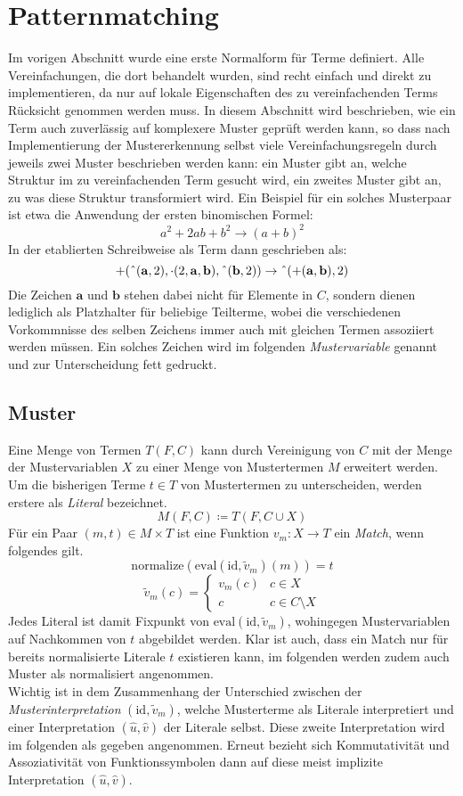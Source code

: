 \documentclass{scrartcl}
\begin{document}
\section{Patternmatching}
Im vorigen Abschnitt wurde eine erste Normalform für Terme definiert. Alle Vereinfachungen, die dort behandelt wurden, sind recht einfach und direkt zu implementieren, da nur auf lokale Eigenschaften des zu vereinfachenden Terms Rücksicht genommen werden muss. In diesem Abschnitt wird beschrieben, wie ein Term auch zuverlässig auf komplexere Muster geprüft werden kann, so dass nach Implementierung der Mustererkennung selbst viele Vereinfachungsregeln durch jeweils zwei Muster beschrieben werden kann: ein Muster gibt an, welche Struktur im zu vereinfachenden Term gesucht wird, ein zweites Muster gibt an, zu was diese Struktur transformiert wird. Ein Beispiel für ein solches Musterpaar ist etwa die Anwendung der ersten binomischen Formel:
$$a^2 + 2 a b + b^2 \rightarrow (a + b)^2$$
In der etablierten Schreibweise als Term dann geschrieben als:
$$+(\string^(\mathbf a, 2), \cdot(2, \mathbf a, \mathbf b), \string^(\mathbf b, 2)) \rightarrow \string^(+(\mathbf a, \mathbf b), 2)$$
Die Zeichen $\mathbf a$ und $\mathbf b$ stehen dabei nicht für Elemente in $C$, sondern dienen lediglich als Platzhalter für beliebige Teilterme, wobei die verschiedenen Vorkommnisse des selben Zeichens immer auch mit gleichen Termen assoziiert werden müssen. Ein solches Zeichen wird im folgenden \emph{Mustervariable} genannt und zur Unterscheidung fett gedruckt.

\subsection{Muster}
Eine Menge von Termen $T(F, C)$ kann durch Vereinigung von $C$ mit der Menge der Mustervariablen $X$ zu einer Menge von Mustertermen $M$ erweitert werden. 
Um die bisherigen Terme $t \in T$ von Mustertermen zu unterscheiden, werden erstere als \emph{Literal} bezeichnet.
$$M(F, C) \coloneqq T(F, C \cup X)$$
Für ein Paar $(m, t) \in M \times T$ ist eine Funktion $v_m \colon X \rightarrow T$ ein \emph{Match}, wenn folgendes gilt.
$$\mathrm{normalize}(\mathrm{eval}(\mathrm{id}, \tilde v_m)(m))= t$$
$$\tilde v_m(c) = \begin{cases}
	v_m(c) & c \in X\\
	c         & c \in C \setminus X
\end{cases}$$
Jedes Literal ist damit Fixpunkt von $\mathrm{eval}(\mathrm{id}, \tilde v_m)$, wohingegen Mustervariablen auf Nachkommen von $t$ abgebildet werden. 
Klar ist auch, dass ein Match nur für bereits normalisierte Literale $t$ existieren kann, im folgenden werden zudem auch Muster als normalisiert angenommen.\\
Wichtig ist in dem Zusammenhang der Unterschied zwischen der \emph{Musterinterpretation} $(\mathrm{id}, \tilde v_m)$, welche Musterterme als Literale interpretiert und einer Interpretation $(\hat{u}, \hat{v})$ der Literale selbst. Diese zweite Interpretation wird im folgenden als gegeben angenommen. Erneut bezieht sich Kommutativität und Assoziativität von Funktionssymbolen dann auf diese meist implizite Interpretation $(\hat u, \hat v)$.\\
\end{document}
